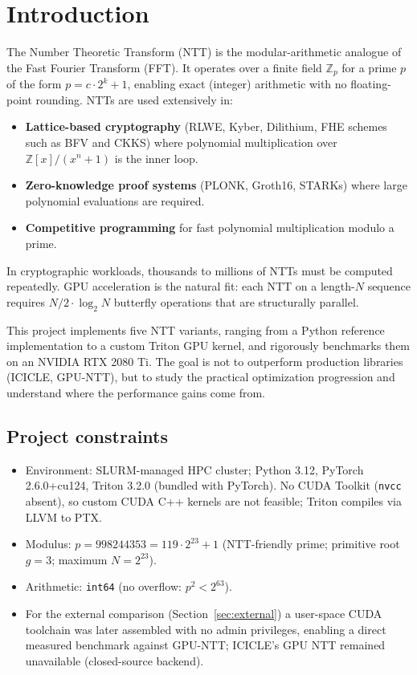 \documentclass[11pt,a4paper]{article}
\begin{document}
\tableofcontents
\newpage

\section{Introduction}

The Number Theoretic Transform (NTT) is the modular-arithmetic analogue of the Fast
Fourier Transform (FFT). It operates over a finite field $\mathbb{Z}_p$ for a prime $p$
of the form $p = c \cdot 2^k + 1$, enabling exact (integer) arithmetic with no
floating-point rounding. NTTs are used extensively in:

\begin{itemize}
  \item \textbf{Lattice-based cryptography} (RLWE, Kyber, Dilithium, FHE schemes such
    as BFV and CKKS) where polynomial multiplication over $\mathbb{Z}[x]/(x^n+1)$ is
    the inner loop.
  \item \textbf{Zero-knowledge proof systems} (PLONK, Groth16, STARKs) where large
    polynomial evaluations are required.
  \item \textbf{Competitive programming} for fast polynomial multiplication modulo a prime.
\end{itemize}

In cryptographic workloads, thousands to millions of NTTs must be computed repeatedly.
GPU acceleration is the natural fit: each NTT on a length-$N$ sequence requires $N/2
\cdot \log_2 N$ butterfly operations that are structurally parallel.

This project implements five NTT variants, ranging from a Python reference implementation
to a custom Triton GPU kernel, and rigorously benchmarks them on an NVIDIA RTX 2080 Ti.
The goal is not to outperform production libraries (ICICLE, GPU-NTT), but to study the
practical optimization progression and understand where the performance gains come from.

\subsection*{Project constraints}

\begin{itemize}
  \item Environment: SLURM-managed HPC cluster; Python 3.12, PyTorch 2.6.0+cu124,
    Triton 3.2.0 (bundled with PyTorch). No CUDA Toolkit (\texttt{nvcc} absent), so
    custom CUDA C++ kernels are not feasible; Triton compiles via LLVM to PTX.
  \item Modulus: $p = 998244353 = 119 \cdot 2^{23} + 1$ (NTT-friendly prime; primitive
    root $g = 3$; maximum $N = 2^{23}$).
  \item Arithmetic: \texttt{int64} (no overflow: $p^2 < 2^{63}$).
  \item For the external comparison (Section~\ref{sec:external}) a user-space CUDA toolchain
    was later assembled with no admin privileges, enabling a direct measured benchmark against
    GPU-NTT; ICICLE's GPU NTT remained unavailable (closed-source backend).
\end{itemize}
\end{document}
